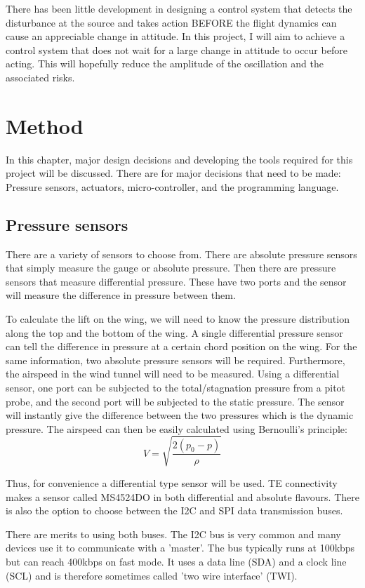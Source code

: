 \documentclass[
11pt, %
english, %
onehalfspacex, %
headsepline, %
] %
{MastersDoctoralThesis}
\begin{document}
There has been little development in designing a control system that detects the disturbance at the source and takes action BEFORE the flight dynamics can cause an appreciable change in attitude. In this project, I will aim to achieve a control system that does not wait for a large change in attitude to occur before acting. This will hopefully reduce the amplitude of the oscillation and the associated risks. 
\chapter{Method}
In this chapter, major design decisions and developing the tools required for this project will be discussed. There are for major decisions that need to be made: Pressure sensors, actuators, micro-controller, and the programming language. 
\section{Pressure sensors}
There are a variety of sensors to choose from. There are absolute pressure sensors that simply measure the gauge or absolute pressure. Then there are pressure sensors that measure differential pressure. These have two ports and the sensor will measure the difference in pressure between them. 

To calculate the lift on the wing, we will need to know the pressure distribution along the top and the bottom of the wing. A single differential pressure sensor can tell the difference in pressure at a certain chord position on the wing. For the same information, two absolute pressure sensors will be required. Furthermore, the airspeed in the wind tunnel will need to be measured. Using a differential sensor, one port can be subjected to the total/stagnation pressure from a pitot probe, and the second port will be subjected to the static pressure. The sensor will instantly give the difference between the two pressures which is the dynamic pressure. The airspeed can then be easily calculated using Bernoulli's principle: $$V=\sqrt{\frac{2(p_{0}-p)}{\rho}}$$

Thus, for convenience a differential type sensor will be used. TE connectivity makes a sensor called MS4524DO in both differential and absolute flavours. There is also the option to choose between the I2C and SPI data transmission buses. 

There are merits to using both buses. The I2C bus is very common and many devices use it to communicate with a 'master'. The bus typically runs at 100kbps but can reach 400kbps on fast mode. It uses a data line (SDA) and a clock line (SCL) and is therefore sometimes called 'two wire interface' (TWI). 
\end{document}
